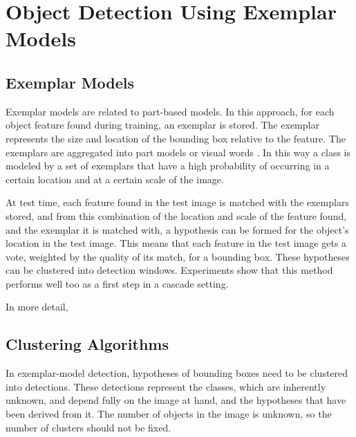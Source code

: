\section{Object Detection Using Exemplar Models} %
\label{cha:object_detection}


\subsection{Exemplar Models} %
\label{sub:exemplar_models}

Exemplar models are related to part-based models.\cite{leibe2004combined, chum2007exemplar} In this approach, for each object feature found during training, an exemplar is stored. The exemplar represents the size and location of the bounding box relative to the feature. The exemplars are aggregated into part models \cite{leibe2004combined} or visual words \cite{chum2007exemplar}. In this way a class is modeled by a set of exemplars that have a high probability of occurring in a certain location and at a certain scale of the image.

At test time, each feature found in the test image is matched with the exemplars stored, and from this combination of the location and scale of the feature found, and the exemplar it is matched with, a hypothesis can be formed for the object's location in the test image. This means that each feature in the test image gets a vote, weighted by the quality of its match, for a bounding box. These hypotheses can be clustered into detection windows. Experiments \cite{vedaldi2009multiple} show that this method performs well too as a first step in a cascade setting.

In more detail, 


\subsection{Clustering Algorithms} %
\label{sub:clustering_algorithms}

In exemplar-model detection, hypotheses of bounding boxes need to be clustered into detections. These detections represent the classes, which are inherently unknown, and depend fully on the image at hand, and the hypotheses that have been derived from it. The number of objects in the image is unknown, so the number of clusters should not be fixed.

